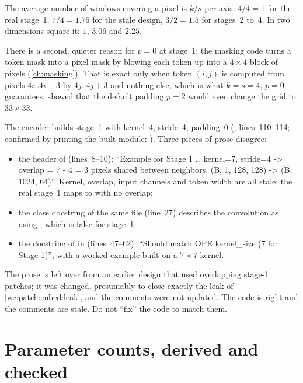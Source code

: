 The average number of windows covering a pixel is $k/s$ per axis: $4/4 = 1$ for the real stage~1,
$7/4 = 1.75$ for the stale design, $3/2 = 1.5$ for stages~2 to~4. In two dimensions square it: $1$,
$3.06$ and $2.25$.

There is a second, quieter reason for $p=0$ at stage~1: the masking code turns a token mask into a pixel
mask by blowing each token up into a $4\times4$ block of pixels (\cref{ch:masking}). That is exact only
when token $(i,j)$ is computed from pixels $4i..4i+3$ by $4j..4j+3$ and nothing else, which is what
$k=s=4$, $p=0$ guarantees.  showed that the default padding $p=2$ would even change
the grid to $33\times33$.

\begin{sourcenote}
The encoder builds stage~1 with kernel~4, stride~4, padding~0
(, lines~110--114; confirmed by
printing the built module: \tagC). Three
pieces of prose disagree:
\begin{itemize}
\item the header of  (lines~8--10):
  ``Example for Stage 1 \ldots{} kernel=7, stride=4 -> overlap = 7 - 4 = 3 pixels shared between
  neighbors, (B, 1, 128, 128) -> (B, 1024, 64)''. Kernel, overlap, input channels and token width are
  all stale; the real stage~1 maps  to  with no overlap;
\item the class docstring of the same file (line~27) describes the convolution as using
  , which is false for stage~1;
\item the docstring of  in 
  (lines~47--62): ``Should match OPE kernel\_size (7 for Stage 1)'', with a worked example built on a
  $7\times7$ kernel.
\end{itemize}
The prose is left over from an earlier design that used overlapping stage-1 patches; it was changed,
presumably to close exactly the leak of \cref{we:patchembed:leak}, and the comments were not updated.
The code is right and the comments are stale. Do not ``fix'' the code to match them.
\end{sourcenote}

\section{Parameter counts, derived and checked}\label{sec:patchembed:count}

